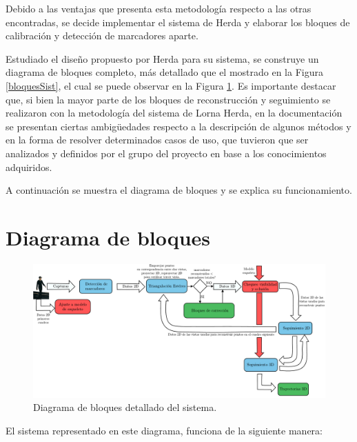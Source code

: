 Debido a las ventajas que presenta esta metodología respecto a las otras encontradas, se decide implementar el sistema de Herda y elaborar los bloques de calibración y detección de marcadores aparte.

Estudiado el diseño propuesto por Herda para su sistema, se construye un diagrama de bloques completo, más detallado que el mostrado en la Figura \ref{bloquesSist}, el cual se puede observar en la Figura \ref{diagBloq}. Es importante destacar que, si bien la mayor parte de los bloques de reconstrucción y seguimiento se realizaron con la metodología del sistema de Lorna Herda\cite{herda}, en la documentación se presentan ciertas ambigüedades respecto a la descripción de algunos métodos y en la forma de resolver determinados casos de uso, que tuvieron que ser analizados y definidos por el grupo del proyecto en base a los conocimientos adquiridos.

A continuación se muestra el diagrama de bloques y se explica su funcionamiento.

\section{Diagrama de bloques}

\vspace{-0.5cm}
\begin{figure}[ht!]
\hspace{-1cm}
\includegraphics[scale=0.55]{img/Sistema_completo/Diagramadebloques_Herda.pdf}
\vspace{-1cm}
\caption{Diagrama de bloques detallado del sistema.}
\label{diagBloq}
\end{figure}

El sistema representado en este diagrama, funciona de la siguiente manera:

